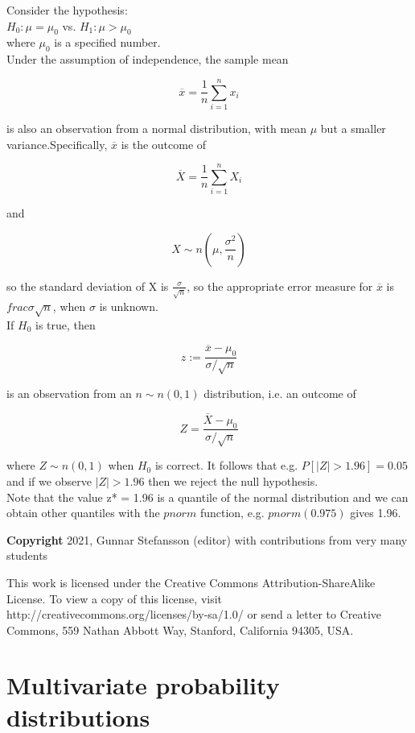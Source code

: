 \documentclass[12pt,a4paper]{article}
\theoremstyle{regla}
\theoremstyle{remark}
\theoremstyle{definition}
\theoremstyle{nonumberbreak}
\begin{document}
Consider the hypothesis:\\

$H_0: \mu = \mu_0$  vs. $H_1: \mu > \mu_0$\\

where $\mu_0$ is a specified number.\\

Under the assumption of independence, the sample mean

$$\overline{x} = \frac{1}{n} \sum^n_{i=1}x_i$$

is also an observation from a normal distribution, with mean $\mu$ but a smaller variance.Specifically, $\overline{x}$ is the outcome of

$$\overline{X} = \frac{1}{n} \sum^n_{i=1}X_i$$

and 

$$X \sim n(\mu, \frac{ \sigma^2}{n})$$

so the standard deviation of X is $\frac{\sigma}{\sqrt{n}}$, so the appropriate error measure for $\overline{x}$ is $frac{\sigma}{\sqrt{n}}$, when $\sigma$ is unknown.\\

If $H_0$ is true, then

$$z:= \frac{\overline{x}-\mu_0}{\sigma / \sqrt{n}}$$

is an observation from an $n \sim n (0,1)$ distribution, i.e. an outcome of 

$$Z= \frac{\overline{X}-\mu_0}{\sigma / \sqrt{n}}$$

where $Z \sim n(0,1)$ when $H_0$ is correct. It follows that e.g. $P[\vert Z \vert > 1.96] = 0.05$ and if we observe $\vert Z \vert > 1.96$ then we reject the null hypothesis.\\

Note that the value z* = 1.96 is a quantile of the normal distribution and we can obtain other quantiles with the $pnorm$ function, e.g. $pnorm(0.975)$ gives 1.96.

{\bf Copyright}
2021, Gunnar Stefansson (editor) with contributions from very many students

This work is licensed under the Creative Commons
Attribution-ShareAlike License. To view a copy of this license, visit
http://creativecommons.org/licenses/by-sa/1.0/ or send a letter to
Creative Commons, 559 Nathan Abbott Way, Stanford, California 94305,
USA.
\clearpage
\section{Multivariate probability distributions}
\end{document}
